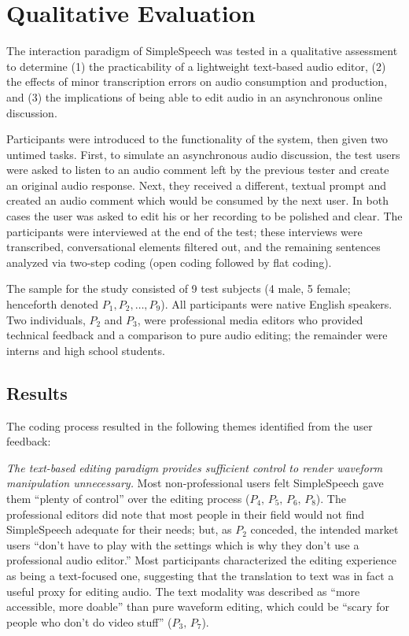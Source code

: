 \section{Qualitative Evaluation}

The interaction paradigm of SimpleSpeech was tested in a qualitative assessment to determine (1) the practicability of a lightweight text-based audio editor, (2) the effects of minor transcription errors on audio consumption and production, and (3) the implications of being able to edit audio in an asynchronous online discussion.

Participants were introduced to the functionality of the system, then given two untimed tasks. 
First, to simulate an asynchronous audio discussion, the test users were asked to listen to an audio comment left by the previous tester and create an original audio response. 
Next, they received a different, textual prompt and created an audio comment which would be consumed by the next user. 
In both cases the user was asked to edit his or her recording to be polished and clear.
The participants were interviewed at the end of the test; these interviews were transcribed, conversational elements filtered out, and the remaining sentences analyzed via two-step coding (open coding followed by flat coding). 

The sample for the study consisted of 9 test subjects (4 male, 5 female; henceforth denoted $P_1, P_2, \ldots, P_9$). 
All participants were native English speakers. 
Two individuals, $P_2$ and $P_3$, were professional media editors who provided technical feedback and a comparison to pure audio editing; the remainder were interns and high school students.

\subsection{Results}
The coding process resulted in the following themes identified from the user feedback:

\emph{The text-based editing paradigm provides sufficient control to render waveform manipulation unnecessary.}
Most non-professional users felt SimpleSpeech gave them ``plenty of control'' over the editing process ($P_4,\,P_5,\,P_6,\,P_8$). 
The professional editors did note that most people in their field would not find SimpleSpeech adequate for their needs; but, as $P_2$ conceded, the intended market users ``don't have to play with the settings which is why they don't use a professional audio editor.''
Most participants characterized the editing experience as being a text-focused one, suggesting that the translation to text was in fact a useful proxy for editing audio. 
The text modality was described as ``more accessible, more doable'' than pure waveform editing, which could be ``scary for people who don't do video stuff'' ($P_3,\,P_7$). 

